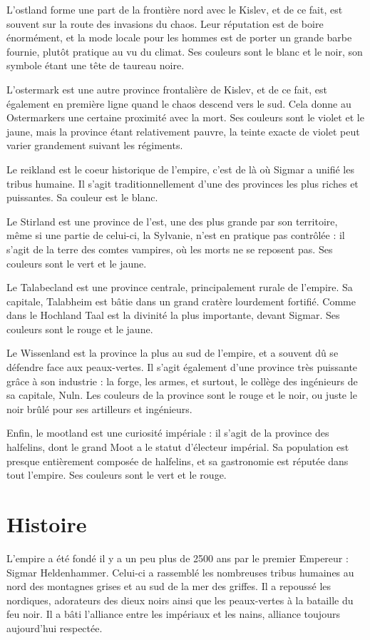 \documentclass[10pt,a4paper]{book}
\begin{document}
L'ostland forme une part de la frontière nord avec le Kislev, et de ce fait, est souvent sur la route des invasions du chaos. Leur réputation est de boire énormément, et la mode locale pour les hommes est de porter un grande barbe fournie, plutôt pratique au vu du climat. Ses couleurs sont le blanc et le noir, son symbole étant une tête de taureau noire.

L'ostermark est une autre province frontalière de Kislev, et de ce fait, est également en première ligne quand le chaos descend vers le sud. Cela donne au Ostermarkers une certaine proximité avec la mort. Ses couleurs sont le violet et le jaune, mais la province étant relativement pauvre, la teinte exacte de violet peut varier grandement suivant les régiments.

Le reikland est le coeur historique de l'empire, c'est de là où Sigmar a unifié les tribus humaine. Il s'agit traditionnellement d'une des provinces les plus riches et puissantes. Sa couleur est le blanc.

Le Stirland est une province de l'est, une des plus grande par son territoire, même si une partie de celui-ci, la Sylvanie, n'est en pratique pas contrôlée : il s'agit de la terre des comtes vampires, où les morts ne se reposent pas. Ses couleurs sont le vert et le jaune.

Le Talabecland est une province centrale, principalement rurale de l'empire. Sa capitale, Talabheim est bâtie dans un grand cratère lourdement fortifié. Comme dans le Hochland Taal est la divinité la plus importante, devant Sigmar. Ses couleurs sont le rouge et le jaune.

Le Wissenland est la province la plus au sud de l'empire, et a souvent dû se défendre face aux peaux-vertes. Il s'agit également d'une province très puissante grâce à son industrie : la forge, les armes, et surtout, le collège des ingénieurs de sa capitale, Nuln. Les couleurs de la province sont le rouge et le noir, ou juste le noir brûlé pour ses artilleurs et ingénieurs.

Enfin, le mootland est une curiosité impériale : il s'agit de la province des halfelins, dont le grand Moot a le statut d'électeur impérial. Sa population est presque entièrement composée de halfelins, et sa gastronomie est réputée dans tout l'empire. Ses couleurs sont le vert et le rouge.
\section{Histoire}
L'empire a été fondé il y a un peu plus de 2500 ans par le premier Empereur : Sigmar Heldenhammer. Celui-ci a rassemblé les nombreuses tribus humaines au nord des montagnes grises et au sud de la mer des griffes. Il a repoussé les nordiques, adorateurs des dieux noirs ainsi que les peaux-vertes à la bataille du feu noir. Il  a bâti l'alliance entre les impériaux et les nains, alliance toujours aujourd'hui respectée.
\end{document}
